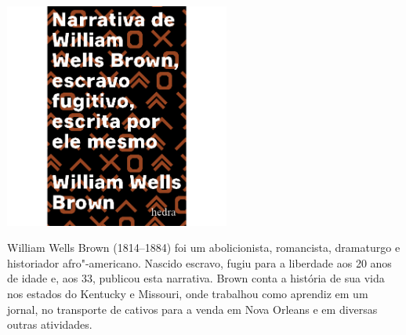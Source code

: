 \vfill

\hspace*{-.4cm}\begin{minipage}[c]{1\linewidth}
\small{
{}}
\end{minipage}

\pagebreak

\begin{center}
\hspace*{-3.6cm}
\hspace*{3.1cm}\includegraphics[width=74mm]{./grid/brown.jpg}
\end{center}

\hspace*{-7cm}\hrulefill\hspace*{-7cm}

\medskip

\noindent{}William Wells Brown (1814--1884) foi um abolicionista, romancista, dramaturgo e historiador afro"-americano. Nascido escravo, fugiu para a liberdade aos 20 anos de idade e, aos 33, publicou esta narrativa. Brown conta a história de sua vida nos estados do Kentucky e Missouri, onde trabalhou como aprendiz em um jornal, no transporte de cativos para a venda em Nova Orleans e em diversas outras atividades. 

